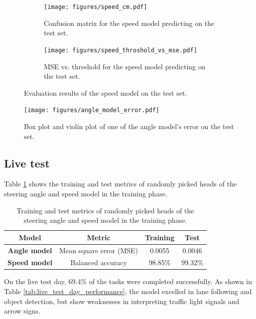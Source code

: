 \documentclass{article}
\begin{document}
\begin{figure}[h]
  \centering
  \begin{subfigure}[b]{0.48\textwidth}
    \texttt{[image: figures/speed\_cm.pdf]}
    \caption{Confusion matrix for the speed model predicting on the test set.}
    \label{fig:speed_cm}
  \end{subfigure}
  \hfill
  \begin{subfigure}[b]{0.48\textwidth}
    \texttt{[image: figures/speed\_throshold\_vs\_mse.pdf]}
    \caption{MSE vs. threshold for the speed model predicting on the test set.}
    \label{fig:speed_throshold_vs_mse}
  \end{subfigure}
  \caption{Evaluation results of the speed model on the test set.}
  \label{fig:speed_model_eval}
\end{figure}

\begin{figure}[h]
  \centering
  \texttt{[image: figures/angle\_model\_error.pdf]}
  \caption{Box plot and violin plot of one of the angle model's error on the test set.}
  \label{fig:angle_model_error}
\end{figure}



\subsection{Live test}
Table \ref{tab:live_test_model_losses} shows the training and test metrics of randomly picked heads of the steering angle and speed model in the training phase.
\begin{table}[h]
  \centering
  \renewcommand{\arraystretch}{1.3}
  \begin{tabular}{|c|c|c|c|}
    \hline
    \textbf{Model}       & \textbf{Metric}         & \textbf{Training} & \textbf{Test} \\
    \hline
    \textbf{Angle model} & Mean square error (MSE) & 0.0055            & 0.0046        \\
    \hline
    \textbf{Speed model} & Balanced accuracy       & 98.85\%           & 99.32\%       \\
    \hline
  \end{tabular}
  \vspace{0.5em}
  \caption{Training and test metrics of randomly picked heads of the steering angle and speed model in the training phase.}
  \label{tab:live_test_model_losses}
\end{table}

On the live test day, 69.4\% of the tasks were completed successfully. As shown in Table \ref{tab:live_test_day_performance}, the model excelled in lane following and object detection, but show weaknesses in interpreting traffic light signals and arrow signs.
\end{document}
